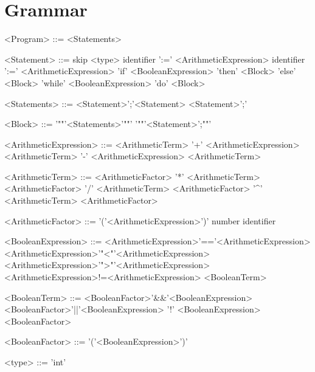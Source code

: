 \section*{Grammar}

\begin{grammar}
    <Program> ::= <Statements>

    <Statement> ::= skip
    \alt <type> identifier ':=' <ArithmeticExpression>
    \alt identifier ':=' <ArithmeticExpression>
    \alt 'if' <BooleanExpression> 'then' <Block> 'else' <Block>
    \alt 'while' <BooleanExpression> 'do' <Block>

    <Statements> ::= <Statement>';'<Statement>
    \alt <Statement>';'

    <Block> ::= '"{"'<Statements>'"}"'
    \alt '"{"'<Statement>';"}"'

    <ArithmeticExpression> ::= <ArithmeticTerm> '+' <ArithmeticExpression>
    \alt <ArithmeticTerm> '-' <ArithmeticExpression>
    \alt <ArithmeticTerm>

    <ArithmeticTerm> ::= <ArithmeticFactor> '*' <ArithmeticTerm>
    \alt <ArithmeticFactor> '/' <ArithmeticTerm>
    \alt <ArithmeticFactor> '^' <ArithmeticTerm>
    \alt <ArithmeticFactor>

    <ArithmeticFactor> ::= '('<ArithmeticExpression>')'
    \alt number
    \alt identifier

    <BooleanExpression> ::= <ArithmeticExpression>'=='<ArithmeticExpression>
    \alt <ArithmeticExpression>'"<"'<ArithmeticExpression>
    \alt <ArithmeticExpression>'">"'<ArithmeticExpression>
    \alt <ArithmeticExpression>!=<ArithmeticExpression>
    \alt <BooleanTerm>

    <BooleanTerm> ::= <BooleanFactor>'\&\&'<BooleanExpression>
    \alt <BooleanFactor>'||'<BooleanExpression>
    \alt '!' <BooleanExpression>
    \alt <BooleanFactor>

    <BooleanFactor> ::= '('<BooleanExpression>')'

    <type> ::= 'int'
\end{grammar}

